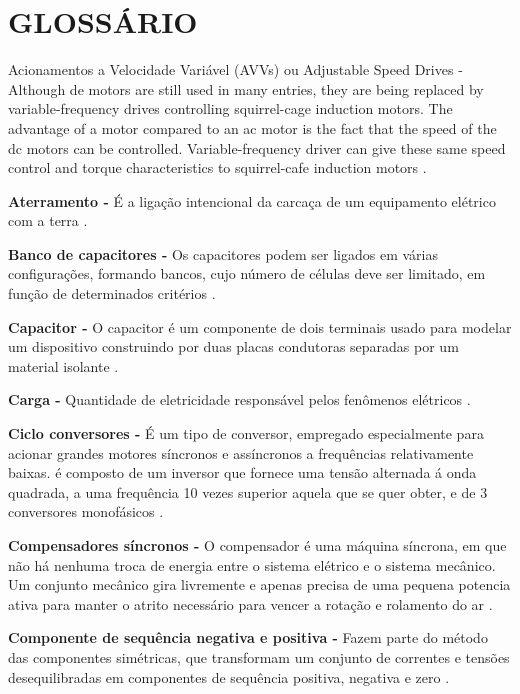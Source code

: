 \chapter*{GLOSSÁRIO}\label{gloss}
\singlespacing
\noindent
Acionamentos a Velocidade Variável (AVVs) ou Adjustable Speed Drives - Although de motors are still used in many entries, they are being replaced by variable-frequency drives controlling squirrel-cage induction motors. The advantage of a motor compared to an ac motor is the fact that the speed of the dc motors can be controlled. Variable-frequency driver can give these same speed control and torque characteristics to squirrel-cafe induction motors \cite{SMI04}.

\noindent
\textbf{Aterramento -} É a ligação intencional da carcaça de um equipamento elétrico com a terra \cite{COR05}. 

\noindent
\textbf{Banco de capacitores -} Os capacitores podem ser ligados em várias configurações, formando bancos, cujo número de células deve ser limitado, em função de determinados critérios \cite{FIL05}.

\noindent
\textbf{Capacitor -} O capacitor é um componente de dois terminais usado para modelar um dispositivo construindo por duas placas condutoras separadas por um material isolante \cite{DOR08}.

\noindent
\textbf{Carga -} Quantidade de eletricidade responsável pelos fenômenos elétricos \cite{DOR08}.

\noindent
\textbf{Ciclo conversores -} É um tipo de conversor, empregado especialmente para acionar grandes motores síncronos e assíncronos a frequências relativamente baixas. é composto de um inversor que fornece uma tensão alternada á onda quadrada, a uma frequência 10 vezes superior aquela que se quer obter, e de 3 conversores monofásicos \cite{FIN02}.

\noindent
\textbf{Compensadores síncronos -} O compensador é uma máquina síncrona, em que não há nenhuma troca de energia entre o sistema elétrico e o sistema mecânico. Um conjunto mecânico gira livremente e apenas precisa de uma pequena potencia ativa para manter o atrito necessário para vencer a rotação e rolamento do ar \cite{ANT03}.

\noindent
\textbf{Componente de sequência negativa e positiva -} Fazem parte do método das componentes simétricas, que transformam um conjunto de correntes e tensões desequilibradas em componentes de sequência positiva, negativa e zero \cite{CAB10}.

